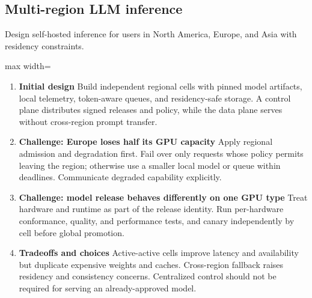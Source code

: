 \subsection{Multi-region LLM inference}
Design self-hosted inference for users in North America, Europe, and Asia with residency constraints.
\begin{center}\begin{adjustbox}{max width=\linewidth}\end{adjustbox}\end{center}
\begin{enumerate}
\item \textbf{Initial design} Build independent regional cells with pinned model artifacts, local telemetry, token-aware queues, and residency-safe storage. A control plane distributes signed releases and policy, while the data plane serves without cross-region prompt transfer.
\item \textbf{Challenge: Europe loses half its GPU capacity} Apply regional admission and degradation first. Fail over only requests whose policy permits leaving the region; otherwise use a smaller local model or queue within deadlines. Communicate degraded capability explicitly.
\item \textbf{Challenge: model release behaves differently on one GPU type} Treat hardware and runtime as part of the release identity. Run per-hardware conformance, quality, and performance tests, and canary independently by cell before global promotion.
\item \textbf{Tradeoffs and choices} Active-active cells improve latency and availability but duplicate expensive weights and caches. Cross-region fallback raises residency and consistency concerns. Centralized control should not be required for serving an already-approved model.
\end{enumerate}
